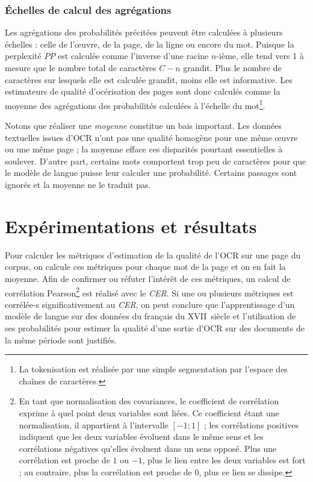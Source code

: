 \documentclass[10pt,twoside]{article}
\begin{document}
	    \subsubsection{\'{E}chelles de calcul des agrégations}\label{echelle}
	    Les agrégations des probabilités précitées peuvent être calculées à plusieurs échelles : celle de l'\oe{}uvre, de la page, de la ligne 
	    ou encore du mot. Puisque la perplexité $PP$ est calculée comme l'inverse d'une racine $n$-ième, elle tend vers 1 à mesure que le nombre 
	    total de caractères $C - n$ grandit. Plus le nombre de caractères sur lesquels elle est calculée grandit, moins elle est informative. 
	    Les estimateurs de qualité d'océrisation des pages sont donc calculés comme la moyenne des agrégations des probabilités
	    calculées à l'échelle du mot\footnote{La tokenisation est réalisée par une simple segmentation par l'espace des chaînes de caractères.}.

	    Notons que réaliser une \textit{moyenne} constitue un bais important. Les données textuelles issues d'OCR n'ont pas une qualité homogène
	    pour une même \oe{}uvre ou une même page ; la moyenne efface ces disparités pourtant essentielles à soulever. D'autre
	    part, certains mots comportent trop peu de caractères pour que le modèle de langue puisse leur calculer une probabilité. Certains passages sont 
	    ignorés et la moyenne ne le traduit pas. 


\section{Expérimentations et résultats}\label{expe}

Pour calculer les métriques d'estimation de la qualité de l'OCR sur une page du corpus, on calcule ces métriques pour chaque mot de la page
et on en fait la moyenne. Afin de confirmer ou réfuter l'intérêt de ces métriques, un calcul de corrélation 
Pearson\footnote{En tant que normalisation des covariances, le coefficient de corrélation exprime à quel point deux variables 
sont liées. Ce coefficient étant une normalisation, il appartient à l'intervalle $\left[-1;1\right]$ ; les corrélations 
positives indiquent que les deux variables évoluent dans le même sens et les corrélations négatives qu'elles évoluent dans un sens opposé. 
Plus une corrélation est proche de $1$ ou $-1$, plus le lien entre les deux variables est fort ; au
contraire, plus la corrélation est proche de $0$, plus ce lien se dissipe.}  
est réalisé avec le \textit{CER}. Si une ou plusieurs métriques est corrélée-s significativement au \textit{CER}, on peut
conclure que l'apprentissage d'un modèle de langue sur des données du français du XVII\ieme~siècle et l'utilisation de ses 
probabilités pour estimer la qualité d'une sortie d'OCR sur des documents de la même période sont justifiés.
\end{document}
